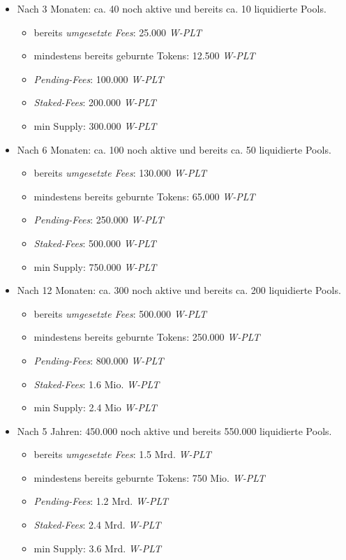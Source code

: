 \begin{Example}
\begin{itemize}
	\item Nach 3 Monaten: ca. 40 noch aktive und bereits ca. 10 liquidierte Pools.
	\begin{itemize}
		\item bereits \textit{umgesetzte Fees}: 25.000 \textit{W-PLT} 
		\item mindestens bereits geburnte Tokens: 12.500 \textit{W-PLT} 
		\item \textit{Pending-Fees}: 100.000 \textit{W-PLT}  
		\item \textit{Staked-Fees}: 200.000 \textit{W-PLT}
		\item min Supply: 300.000 \textit{W-PLT}
	\end{itemize}
	\item Nach 6 Monaten: ca. 100 noch aktive und bereits ca. 50 liquidierte Pools.
	\begin{itemize}
		\item bereits \textit{umgesetzte Fees}: 130.000 \textit{W-PLT}
		\item mindestens bereits geburnte Tokens: 65.000 \textit{W-PLT}  
		\item \textit{Pending-Fees}: 250.000 \textit{W-PLT}
		\item \textit{Staked-Fees}: 500.000 \textit{W-PLT} 
		\item min Supply: 750.000 \textit{W-PLT}
	\end{itemize}
	\item Nach 12 Monaten: ca. 300 noch aktive und bereits ca. 200 liquidierte Pools.
	\begin{itemize}
		\item bereits \textit{umgesetzte Fees}: 500.000 \textit{W-PLT}  
		\item mindestens bereits geburnte Tokens: 250.000 \textit{W-PLT}
		\item \textit{Pending-Fees}: 800.000 \textit{W-PLT}  
		\item \textit{Staked-Fees}: 1.6 Mio. \textit{W-PLT} 
		\item min Supply: 2.4 Mio \textit{W-PLT} 
	\end{itemize}
	\item Nach 5 Jahren: 450.000 noch aktive und bereits 550.000 liquidierte Pools.
	\begin{itemize}
		\item bereits \textit{umgesetzte Fees}: 1.5 Mrd. \textit{W-PLT} 
		\item mindestens bereits geburnte Tokens: 750 Mio. \textit{W-PLT}
		\item \textit{Pending-Fees}: 1.2 Mrd. \textit{W-PLT}
		\item \textit{Staked-Fees}: 2.4 Mrd. \textit{W-PLT} 
		\item min Supply: 3.6 Mrd. \textit{W-PLT} 
	\end{itemize}	 
\end{itemize}

\end{Example}






